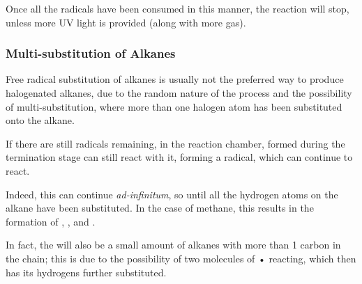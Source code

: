 					Once all the radicals have been consumed in this manner, the reaction will stop, unless more UV light is provided (along
					with more  gas).




			\subsubsection{Multi-substitution of Alkanes}

				Free radical substitution of alkanes is usually not the preferred way to produce
				halogenated alkanes, due to the random nature of the process and the possibility of multi-substitution,
				where more than one halogen atom has been substituted onto the alkane.

				If there are still \ch{\chlorine} radicals remaining, in the reaction chamber,  formed during the
				termination stage can still react with it, forming a  radical, which can continue to react.


				Indeed, this can continue \textit{ad-infinitum}, so until all the hydrogen atoms on the alkane have been substituted.
				In the case of methane, this results in the formation of , ,  and
				.

				In fact, the will also be a small amount of alkanes with more than 1 carbon in the chain; this is due to the
				possibility of two molecules of • reacting, which then has its hydrogens further substituted.





			\pagebreak
